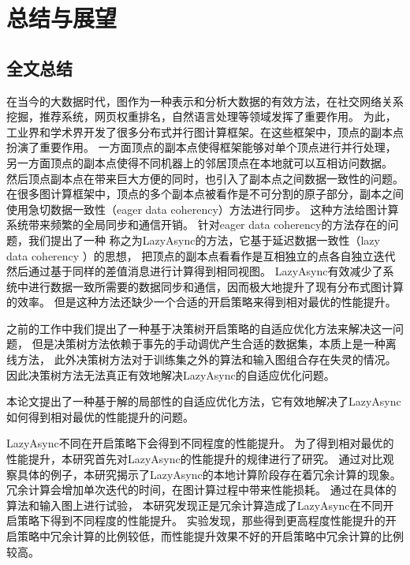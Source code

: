 
\chapter{总结与展望}

\section{全文总结}

在当今的大数据时代，图作为一种表示和分析大数据的有效方法，在社交网络关系挖掘，推荐系统，网页权重排名，自然语言处理等领域发挥了重要作用。
为此，工业界和学术界开发了很多分布式并行图计算框架。在这些框架中，顶点的副本点扮演了重要作用。
一方面顶点的副本点使得框架能够对单个顶点进行并行处理，另一方面顶点的副本点使得不同机器上的邻居顶点在本地就可以互相访问数据。
然后顶点副本点在带来巨大方便的同时，也引入了副本点之间数据一致性的问题。
在很多图计算框架中，顶点的多个副本点被看作是不可分割的原子部分，副本之间使用急切数据一致性（eager data coherency）方法进行同步。
这种方法给图计算系统带来频繁的全局同步和通信开销。
针对eager data coherency的方法存在的问题，我们提出了一种
称之为LazyAsync的方法，它基于延迟数据一致性（lazy data coherency ）的思想，
把顶点的副本点看看作是互相独立的点各自独立迭代然后通过基于同样的差值消息进行计算得到相同视图。
LazyAsync有效减少了系统中进行数据一致所需要的数据同步和通信，因而极大地提升了现有分布式图计算的效率。
但是这种方法还缺少一个合适的开启策略来得到相对最优的性能提升。

之前的工作中我们提出了一种基于决策树开启策略的自适应优化方法来解决这一问题，
但是决策树方法依赖于事先的手动调优产生合适的数据集，本质上是一种离线方法，
此外决策树方法对于训练集之外的算法和输入图组合存在失灵的情况。
因此决策树方法无法真正有效地解决LazyAsync的自适应优化问题。

本论文提出了一种基于解的局部性的自适应优化方法，它有效地解决了LazyAsync如何得到相对最优的性能提升的问题。


LazyAsync不同在开启策略下会得到不同程度的性能提升。
为了得到相对最优的性能提升，本研究首先对LazyAsync的性能提升的规律进行了研究。
通过对比观察具体的例子，本研究揭示了LazyAsync的本地计算阶段存在着冗余计算的现象。
冗余计算会增加单次迭代的时间，在图计算过程中带来性能损耗。
通过在具体的算法和输入图上进行试验，
本研究发现正是冗余计算造成了LazyAsync在不同开启策略下得到不同程度的性能提升。
实验发现，那些得到更高程度性能提升的开启策略中冗余计算的比例较低，而性能提升效果不好的开启策略中冗余计算的比例较高。

